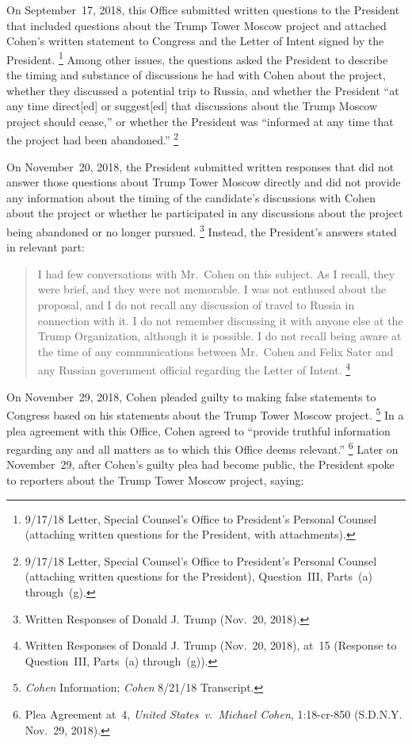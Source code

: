 On September~17, 2018, this Office submitted written questions to the President that included questions about the Trump Tower Moscow project and attached Cohen's written statement to Congress and the Letter of Intent signed by the President.%
\footnote{9/17/18 Letter, Special Counsel's Office to President's Personal Counsel (attaching written questions for the President, with attachments).}
Among other issues, the questions asked the President to describe the timing and substance of discussions he had with Cohen about the project, whether they discussed a potential trip to Russia, and whether the President ``at any time direct[ed] or suggest[ed] that discussions about the Trump Moscow project should cease,'' or whether the President was ``informed at any time that the project had been abandoned.''%
\footnote{9/17/18 Letter, Special Counsel's Office to President's Personal Counsel (attaching written questions for the President), Question~III, Parts~(a) through~(g).}

On November~20, 2018, the President submitted written responses that did not answer those questions about Trump Tower Moscow directly and did not provide any information about the timing of the candidate's discussions with Cohen about the project or whether he participated in any discussions about the project being abandoned or no longer pursued.%
\footnote{Written Responses of Donald J. Trump (Nov.~20, 2018).}
Instead, the President's answers stated in relevant part:

\begin{quote}
I had few conversations with Mr.~Cohen on this subject.
As I recall, they were brief, and they were not memorable.
I was not enthused about the proposal, and I do not recall any discussion of travel to Russia in connection with it.
I do not remember discussing it with anyone else at the Trump Organization, although it is possible.
I do not recall being aware at the time of any communications between Mr.~Cohen and Felix Sater and any Russian government official regarding the Letter of Intent.%
\footnote{Written Responses of Donald J. Trump (Nov.~20, 2018), at~15 (Response to Question~III, Parts~(a) through~(g)).}
\end{quote}

On November~29, 2018, Cohen pleaded guilty to making false statements to Congress based on his statements about the Trump Tower Moscow project.%
\footnote{\textit{Cohen} Information;
\textit{Cohen} 8/21/18 Transcript.}
In a plea agreement with this Office, Cohen agreed to ``provide truthful information regarding any and all matters as to which this Office deems relevant.''%
\footnote{Plea Agreement at~4, \textit{United States~v.\ Michael Cohen}, 1:18-cr-850 (S.D.N.Y. Nov.~29, 2018).}
Later on November~29, after Cohen's guilty plea had become public, the President spoke to reporters about the Trump Tower Moscow project, saying:

